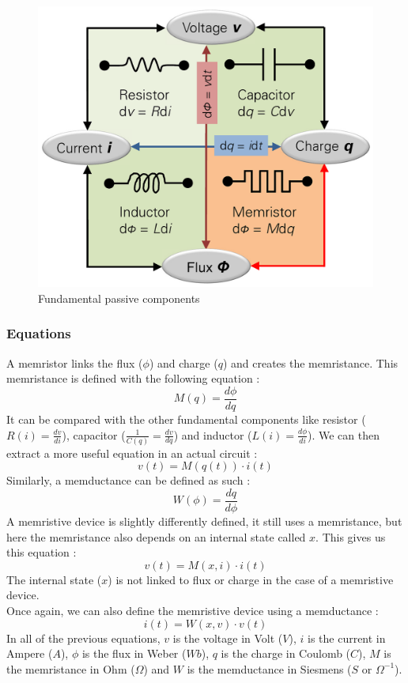 \begin{figure}[H]
    \centering
    \includegraphics{Figures/Memristor.png}
    \caption{Fundamental passive components}
    \label{fig:fundComp}
\end{figure}

\subsubsection{Equations}
A memristor links the flux ($\phi$) and charge ($q$) and creates the memristance.
This memristance is defined with the following equation : 
\begin{equation}
    M(q)=\frac{d\phi}{dq}
\end{equation}
It can be compared with the other fundamental components like resistor ($R(i)=\frac{dv}{di}$), capacitor ($\frac{1}{C(q)}=\frac{dv}{dq}$) and inductor ($L(i)=\frac{d\phi}{di}$).
We can then extract a more useful equation in an actual circuit :
\begin{equation}
    v(t)=M(q(t))\cdot i(t)
\end{equation}
Similarly, a memductance can be defined as such :
\begin{equation}
    W(\phi)=\frac{dq}{d\phi}
\end{equation}
A memristive device is slightly differently defined, it still uses a memristance, but here the memristance also depends on an internal state called $x$. This gives us this equation :
\begin{equation}
    v(t)=M(x,i)\cdot i(t)
\end{equation}
The internal state ($x$) is not linked to flux or charge in the case of a memristive device.\\
Once again, we can also define the memristive device using a memductance :
\begin{equation}
    i(t)=W(x,v)\cdot v(t)
\end{equation}
In all of the previous equations, $v$ is the voltage in Volt ($V$), $i$ is the current in Ampere ($A$), $\phi$ is the flux in Weber ($Wb$), $q$ is the charge in Coulomb ($C$), $M$ is the memristance in Ohm ($\Omega$) and $W$ is the memductance in Siesmens ($S$ or $\Omega^{-1}$).

